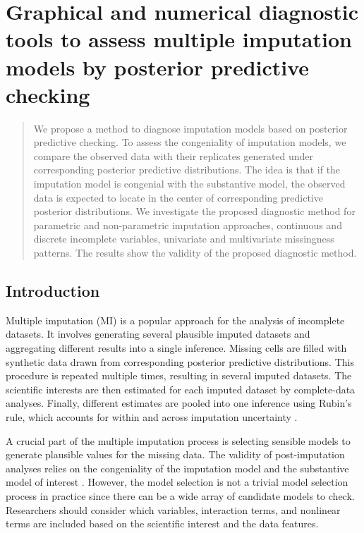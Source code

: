 \chapter{Graphical and numerical diagnostic tools to assess multiple imputation models by posterior predictive checking}
\label{chap6}
	\begin{abstract}
		We propose a method to diagnose imputation models based on posterior predictive checking. To assess the congeniality of imputation models, we compare the observed data with their replicates generated under corresponding posterior predictive distributions. The idea is that if the imputation model is congenial with the substantive model, the observed data is expected to locate in the center of corresponding predictive posterior distributions. We investigate the proposed diagnostic method for parametric and non-parametric imputation approaches, continuous and discrete incomplete variables, univariate and multivariate missingness patterns. The results show the validity of the proposed diagnostic method.  	
	\end{abstract}
	
	\section{Introduction}
	\label{sec:6.1}
	Multiple imputation (MI) is a popular approach for the analysis of incomplete datasets. It involves generating several plausible imputed datasets and aggregating different results into a single inference. Missing cells are filled with synthetic data drawn from corresponding posterior predictive distributions. This procedure is repeated multiple times, resulting in several imputed datasets. The scientific interests are then estimated for each imputed dataset by complete-data analyses. Finally, different estimates are pooled into one inference using Rubin's rule, which accounts for within and across imputation uncertainty \citep{RubinD1987}. 
	
	A crucial part of the multiple imputation process is selecting sensible models to generate plausible values for the missing data. The validity of post-imputation analyses relies on the congeniality of the imputation model and the substantive model of interest \citep{meng1994multiple}. However, the model selection is not a trivial model selection process in practice since there can be a wide array of candidate models to check. Researchers should consider which variables, interaction terms, and nonlinear terms are included based on the scientific interest and the data features.  
	
